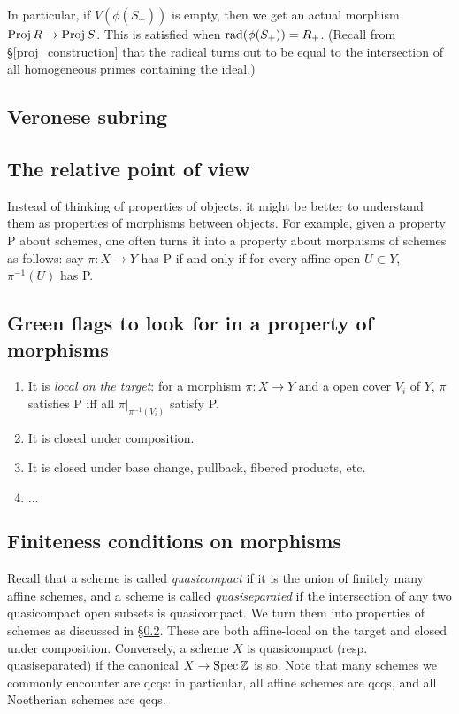 \documentclass[11pt]{amsart}
\begin{document}
In particular, if $V(\phi(S_+))$ is empty, then we get an actual morphism $\operatorname{Proj} R\to \operatorname{Proj} S$. This is satisfied when $\operatorname{rad}(\phi(S_+)) = R_+$. (Recall from \S\ref{proj_construction} that the radical turns out to be equal to the intersection of all homogeneous primes containing the ideal.)

\subsection{Veronese subring}

\subsection{The relative point of view}
\label{rel_POV}

Instead of thinking of properties of objects, it might be better to understand them as properties of morphisms between objects. For example, given a property P about schemes, one often turns it into a property about morphisms of schemes as follows: say $\pi: X\to Y$ has P if and only if for every affine open $U\subset Y$, $\pi^{-1}(U)$ has P.

\subsection{Green flags to look for in a property of morphisms}

\begin{enumerate}
    \item It is \emph{local on the target}: for a morphism $\pi: X\to Y$ and a open cover $V_i$ of $Y$, $\pi$ satisfies P iff all $\pi|_{\pi^{-1}(V_i)}$ satisfy P.
    \item It is closed under composition.
    \item It is closed under base change, pullback, fibered products, etc.
    \item $\dots$
\end{enumerate}

\subsection{Finiteness conditions on morphisms}

Recall that a scheme is called \emph{quasicompact} if it is the union of finitely many affine schemes, and a scheme is called \emph{quasiseparated} if the intersection of any two quasicompact open subsets is quasicompact. We turn them into properties of schemes as discussed in \S\ref{rel_POV}. These are both affine-local on the target and closed under composition. Conversely, a scheme $X$ is quasicompact (resp. quasiseparated) if the canonical $X\to \operatorname{Spec} \mathbb{Z}$ is so. Note that many schemes we commonly encounter are qcqs: in particular, all affine schemes are qcqs, and all Noetherian schemes are qcqs.
\end{document}
